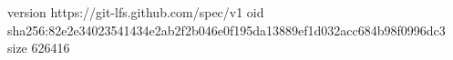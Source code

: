 version https://git-lfs.github.com/spec/v1
oid sha256:82e2e34023541434e2ab2f2b046e0f195da13889ef1d032acc684b98f0996dc3
size 626416
